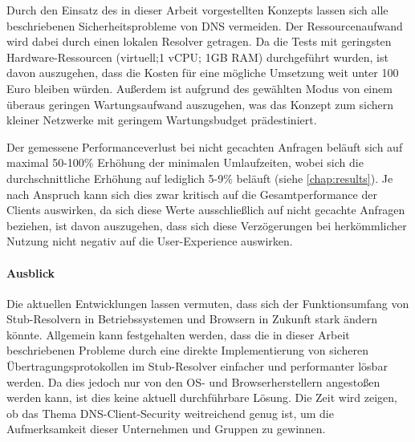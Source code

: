 Durch den Einsatz des in dieser Arbeit vorgestellten Konzepts lassen sich alle beschriebenen Sicherheitsprobleme von DNS vermeiden. Der Ressourcenaufwand wird dabei durch einen lokalen Resolver getragen. Da die Tests mit geringsten Hardware-Ressourcen (virtuell;1 vCPU; 1GB RAM) durchgeführt wurden, ist davon auszugehen, dass die Kosten für eine mögliche Umsetzung weit unter 100 Euro bleiben würden. Außerdem ist aufgrund des gewählten Modus von einem überaus geringen Wartungsaufwand auszugehen, was das Konzept zum sichern kleiner Netzwerke mit geringem Wartungsbudget prädestiniert.

Der gemessene Performanceverlust bei nicht gecachten Anfragen beläuft sich auf maximal 50-100\% Erhöhung der minimalen Umlaufzeiten, wobei sich die durchschnittliche Erhöhung auf lediglich 5-9\% beläuft  (siehe \ref{chap:results}). Je nach Anspruch kann sich dies zwar kritisch auf die Gesamtperformance der Clients auswirken, da sich diese Werte ausschließlich auf nicht gecachte Anfragen beziehen, ist davon auszugehen, dass sich diese Verzögerungen bei herkömmlicher Nutzung nicht negativ auf die User-Experience auswirken.

\paragraph{Ausblick}
Die aktuellen Entwicklungen lassen vermuten, dass sich der Funktionsumfang von Stub-Resolvern in Betriebssystemen\cite{Wallen2018} und Browsern\cite{McManus2018a} in Zukunft stark ändern könnte. Allgemein kann festgehalten werden, dass die in dieser Arbeit beschriebenen Probleme durch eine direkte Implementierung von sicheren Übertragungsprotokollen im Stub-Resolver einfacher und performanter lösbar werden. Da dies jedoch nur von den \ac{OS}- und Browserherstellern angestoßen werden kann, ist dies keine aktuell durchführbare Lösung. Die Zeit wird zeigen, ob das Thema DNS-Client-Security weitreichend genug ist, um die Aufmerksamkeit dieser Unternehmen und Gruppen zu gewinnen.  

